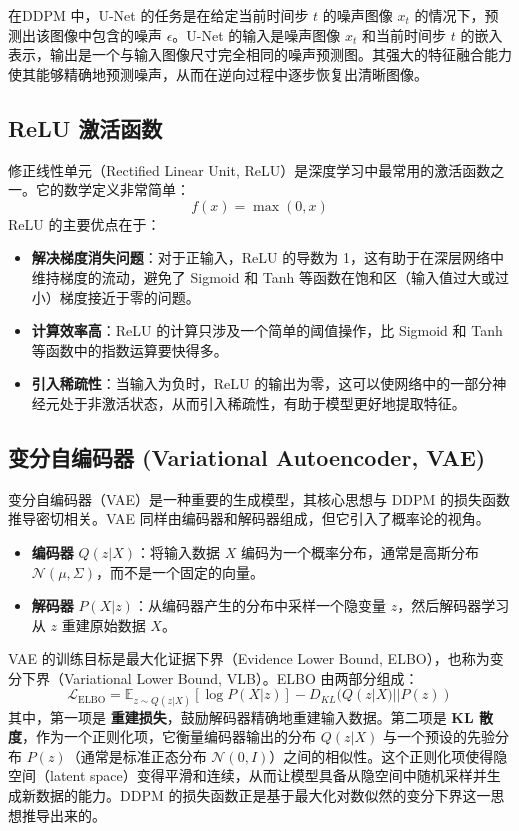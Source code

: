 \documentclass{ctexart}
\begin{document}
\noindent 
在DDPM 中，U-Net 的任务是在给定当前时间步 $t$ 的噪声图像 $x_t$ 的情况下，预测出该图像中包含的噪声 $\epsilon$。U-Net 的输入是噪声图像 $x_t$ 和当前时间步 $t$ 的嵌入表示，输出是一个与输入图像尺寸完全相同的噪声预测图。其强大的特征融合能力使其能够精确地预测噪声，从而在逆向过程中逐步恢复出清晰图像。


\subsection{ReLU 激活函数}
\noindent
修正线性单元（Rectified Linear Unit, ReLU）是深度学习中最常用的激活函数之一。它的数学定义非常简单：
$$ f(x) = \max(0, x) $$
ReLU 的主要优点在于：
\begin{itemize}
    \item \textbf{解决梯度消失问题}：对于正输入，ReLU 的导数为 1，这有助于在深层网络中维持梯度的流动，避免了 Sigmoid 和 Tanh 等函数在饱和区（输入值过大或过小）梯度接近于零的问题。
    \item \textbf{计算效率高}：ReLU 的计算只涉及一个简单的阈值操作，比 Sigmoid 和 Tanh 等函数中的指数运算要快得多。
    \item \textbf{引入稀疏性}：当输入为负时，ReLU 的输出为零，这可以使网络中的一部分神经元处于非激活状态，从而引入稀疏性，有助于模型更好地提取特征。
\end{itemize}

\subsection{变分自编码器 (Variational Autoencoder, VAE)}
\noindent
变分自编码器（VAE）是一种重要的生成模型，其核心思想与 DDPM 的损失函数推导密切相关。VAE 同样由编码器和解码器组成，但它引入了概率论的视角。
\begin{itemize}
    \item \textbf{编码器} $Q(z|X)$：将输入数据 $X$ 编码为一个概率分布，通常是高斯分布 $\mathcal{N}(\mu, \Sigma)$，而不是一个固定的向量。
    \item \textbf{解码器} $P(X|z)$：从编码器产生的分布中采样一个隐变量 $z$，然后解码器学习从 $z$ 重建原始数据 $X$。
\end{itemize}
\noindent
VAE 的训练目标是最大化证据下界（Evidence Lower Bound, ELBO），也称为变分下界（Variational Lower Bound, VLB）。ELBO 由两部分组成：
$$ \mathcal{L}_{\text{ELBO}} = \mathbb{E}_{z \sim Q(z|X)}[\log P(X|z)] - D_{KL}(Q(z|X) || P(z)) $$
其中，第一项是 \textbf{重建损失}，鼓励解码器精确地重建输入数据。第二项是 \textbf{KL 散度}，作为一个正则化项，它衡量编码器输出的分布 $Q(z|X)$ 与一个预设的先验分布 $P(z)$（通常是标准正态分布 $\mathcal{N}(0, I)$）之间的相似性。这个正则化项使得隐空间（latent space）变得平滑和连续，从而让模型具备从隐空间中随机采样并生成新数据的能力。DDPM 的损失函数正是基于最大化对数似然的变分下界这一思想推导出来的。
\end{document}
